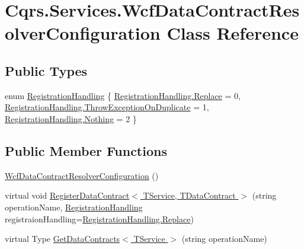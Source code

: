 \hypertarget{classCqrs_1_1Services_1_1WcfDataContractResolverConfiguration}{}\section{Cqrs.\+Services.\+Wcf\+Data\+Contract\+Resolver\+Configuration Class Reference}
\label{classCqrs_1_1Services_1_1WcfDataContractResolverConfiguration}
\subsection*{Public Types}
\begin{DoxyCompactItemize}
\item 
enum \hyperlink{classCqrs_1_1Services_1_1WcfDataContractResolverConfiguration_acf6a145eb88c5d98b31a541cfb1fb152}{Registration\+Handling} \{ \hyperlink{classCqrs_1_1Services_1_1WcfDataContractResolverConfiguration_acf6a145eb88c5d98b31a541cfb1fb152a0ebe6df8a3ac338e0512acc741823fdb}{Registration\+Handling.\+Replace} = 0, 
\hyperlink{classCqrs_1_1Services_1_1WcfDataContractResolverConfiguration_acf6a145eb88c5d98b31a541cfb1fb152a912a5d95306192c4f037d9e353d2a3ca}{Registration\+Handling.\+Throw\+Exception\+On\+Duplicate} = 1, 
\hyperlink{classCqrs_1_1Services_1_1WcfDataContractResolverConfiguration_acf6a145eb88c5d98b31a541cfb1fb152af80a4ad87fee7c9fdc19b7769495fdb5}{Registration\+Handling.\+Nothing} = 2
 \}
\end{DoxyCompactItemize}
\subsection*{Public Member Functions}
\begin{DoxyCompactItemize}
\item 
\hyperlink{classCqrs_1_1Services_1_1WcfDataContractResolverConfiguration_ac6853a244c867a60a64a223f6bcb6a55}{Wcf\+Data\+Contract\+Resolver\+Configuration} ()
\item 
virtual void \hyperlink{classCqrs_1_1Services_1_1WcfDataContractResolverConfiguration_a3f0ed5ca3b65b2ca5a6c31c1e4d5e4ba}{Register\+Data\+Contract$<$ T\+Service, T\+Data\+Contract $>$} (string operation\+Name, \hyperlink{classCqrs_1_1Services_1_1WcfDataContractResolverConfiguration_acf6a145eb88c5d98b31a541cfb1fb152}{Registration\+Handling} registraion\+Handling=\hyperlink{classCqrs_1_1Services_1_1WcfDataContractResolverConfiguration_acf6a145eb88c5d98b31a541cfb1fb152a0ebe6df8a3ac338e0512acc741823fdb}{Registration\+Handling.\+Replace})
\item 
virtual Type \hyperlink{classCqrs_1_1Services_1_1WcfDataContractResolverConfiguration_a7e9e65b16d8f64da60e160ce60628e90}{Get\+Data\+Contracts$<$ T\+Service $>$} (string operation\+Name)
\end{DoxyCompactItemize}
